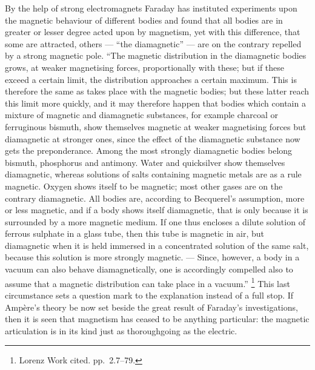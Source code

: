 \documentclass[12pt,a4paper]{book}
\begin{document}
By the help of strong electromagnets Faraday has instituted experiments upon the magnetic behaviour of different bodies
and found that all bodies are in greater or lesser degree acted upon by magnetism, yet with this difference, that some
are attracted, others --- ``the diamagnetic'' --- are on the contrary repelled by a strong magnetic pole. ``The magnetic
distribution in the diamagnetic bodies grows, at weaker magnetising forces, proportionally with these; but if these
exceed a certain
limit, the distribution approaches a certain maximum. This is therefore the same as takes place with the magnetic bodies;
but these latter reach this limit more quickly, and it may therefore happen that bodies which contain a mixture of
magnetic and diamagnetic substances, for example charcoal or ferruginous bismuth, show themselves magnetic at weaker
magnetising forces but diamagnetic at stronger ones, since the effect of the diamagnetic substance now gets the
preponderance. Among the most strongly diamagnetic bodies belong bismuth, phosphorus and antimony. Water and quicksilver
show themselves diamagnetic, whereas solutions of salts containing magnetic metals are as a rule magnetic. Oxygen shows
itself to be magnetic; most other gases are on the contrary diamagnetic. All bodies are, according to Becquerel's
assumption, more or less magnetic, and if a body shows itself diamagnetic, that is only because it is surrounded by a
more magnetic medium. If one thus encloses a dilute solution of ferrous sulphate in a glass tube, then this tube is
magnetic in air, but diamagnetic when it is held immersed in a concentrated solution of the same salt, because this
solution is more strongly magnetic. --- Since, however, a body in a vacuum can also behave
diamagnetically, one is accordingly compelled also to assume that a magnetic distribution can take place in a
vacuum.'' %
\footnote{%
Lorenz Work cited. pp.\ 2.7--79.}
This last circumstance sets a question mark to the explanation instead of a full stop. If Ampère's theory be now set
beside the great result of Faraday's investigations, then it is seen that magnetism has ceased to be anything particular:
the magnetic articulation is in its kind just as thoroughgoing as the electric.
\end{document}
